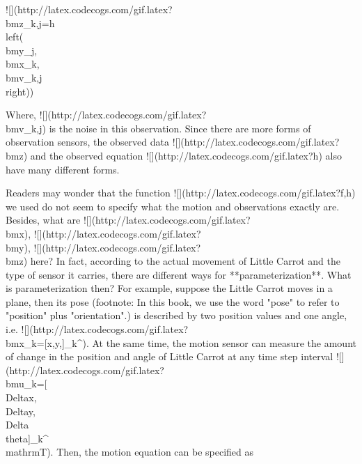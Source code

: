 ![](http://latex.codecogs.com/gif.latex?\\bm{z}_{k,j}=h\\left({{\\bm{y}_j},{\\bm{x}_k},\\bm{v}_{k,j}}\\right))

Where, ![](http://latex.codecogs.com/gif.latex?\\bm{v}_{k,j}) is the noise in this observation. Since there are more forms of observation sensors, the observed data ![](http://latex.codecogs.com/gif.latex?\\bm{z}) and the observed equation ![](http://latex.codecogs.com/gif.latex?h) also have many different forms.

Readers may wonder that the function ![](http://latex.codecogs.com/gif.latex?f,h) we used do not seem to specify what the motion and observations exactly are. Besides, what are ![](http://latex.codecogs.com/gif.latex?\\bm{x}), ![](http://latex.codecogs.com/gif.latex?\\bm{y}), ![](http://latex.codecogs.com/gif.latex?\\bm{z}) here? In fact, according to the actual movement of Little Carrot and the type of sensor it carries, there are different ways for **parameterization**. What is parameterization then? For example, suppose the Little Carrot moves in a plane, then its pose (footnote: In this book, we use the word "pose" to refer to "position" plus "orientation".) is described by two position values and one angle, i.e. ![](http://latex.codecogs.com/gif.latex?\\bm{x}_k=[x,y,\theta]_k^). At the same time, the motion sensor can measure the amount of change in the position and angle of Little Carrot at any time step interval ![](http://latex.codecogs.com/gif.latex?\\bm{u}_k=[\\Delta{x},\\Delta{y},\\Delta\\theta]_k^\\mathrm{T}). Then, the motion equation can be specified as 

